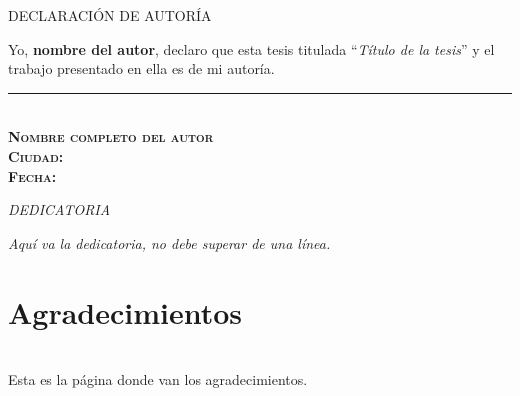 \documentclass{upa-tesis}
\begin{document}
\begin{center}
	\begin{large}
		DECLARACI{\'O}N	DE AUTOR{\'I}A
	\end{large}
\end{center}

\hspace{5em}		

Yo,  \textbf{nombre del autor},  declaro que esta tesis titulada ``\textit{Título de la tesis}'' y el trabajo presentado en ella es de mi autoría.\\

\centering

\hspace{5em}		

\rule[1em]{20em}{0.5pt}\\ %
\textsc{\textbf{Nombre completo del autor}}\\
\vspace{0.1em}
\textsc{\textbf{Ciudad: }}\\
\vspace{0.1em}
\textsc{\textbf{Fecha: }}

\endgroup
\vspace*{\fill}


%
%
\newpage
\thispagestyle{plain}
\normalsize
\begin{flushright}
\textit{DEDICATORIA}

\textit{Aquí va la dedicatoria, no debe superar de una línea.}
\end{flushright}


\thispagestyle{plain}
\newpage
{}
\section*{\Huge{Agradecimientos}}
${}$\\[5 pt]
\normalsize
Esta es la página donde van los agradecimientos.
\end{document}

